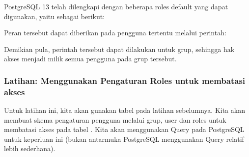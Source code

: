 \documentclass[letterpaper,10pt,english]{sphinxmanual}
\begin{document}
PostgreSQL 13 telah dilengkapi dengan beberapa roles default yang dapat digunakan, yaitu sebagai berikut:


Peran  tersebut dapat diberikan pada pengguna tertentu melalui perintah:

\begin{sphinxVerbatim}[commandchars=\\\{\}]
   
\end{sphinxVerbatim}

Demikian pula, perintah tersebut dapat dilakukan untuk grup, sehingga hak akses menjadi milik semua pengguna pada grup tersebut.


\subsubsection{Latihan: Menggunakan Pengaturan Roles untuk membatasi akses}
\label{\detokenize{sesi2/dbmanagement:latihan-menggunakan-pengaturan-roles-untuk-membatasi-akses}}
Untuk latihan ini, kita akan gunakan tabel  pada latihan sebelumnya. Kita akan membuat skema pengaturan pengguna melalui grup, user dan roles untuk membatasi akses pada tabel . Kita akan menggunakan Query pada PostgreSQL untuk keperluan ini (bukan antarmuka PostgreSQL \sphinxhyphen{} menggunakan Query relatif lebih sederhana).
\end{document}
